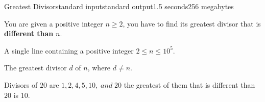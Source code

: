 \begin{problem}{Greatest Divisor}{standard input}{standard output}{1.5 seconds}{256 megabytes}

You are given a positive integer $n \geq 2$, you have to find its greatest divisor that is \textbf{different than} $n$.

\InputFile
A single line containing a positive integer $ 2 \leq n \leq 10^5 $.

\OutputFile
The greatest divisor $d$ of $n$, where $d \neq n$.

\Example

\begin{example}
%
\end{example}

\Note
Divisors of $20$ are $1, 2, 4, 5, 10, \; and \; 20$ the greatest of them that is different than $20$ is $10$. 

\end{problem}

